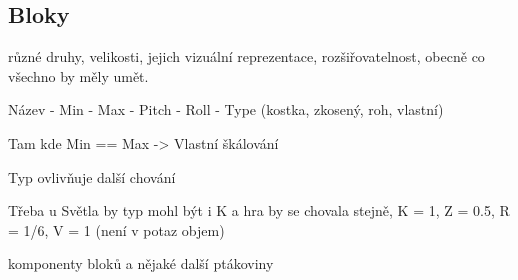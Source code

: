 
\subsection{Bloky}

různé druhy, velikosti, jejich vizuální reprezentace, rozšiřovatelnost, obecně co všechno by měly umět.

Název - Min - Max - Pitch - Roll - Type (kostka, zkosený, roh, vlastní)

Tam kde Min == Max -> Vlastní škálování

Typ ovlivňuje další chování

Třeba u Světla by typ mohl být i K a hra by se chovala stejně, K = 1, Z = 0.5, R = 1/6, V = 1 (není v potaz objem)

komponenty bloků a nějaké další ptákoviny

